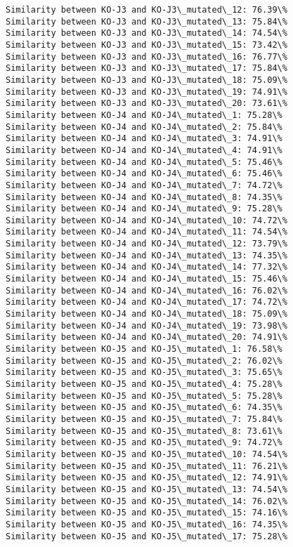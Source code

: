 \documentclass[11pt]{article}
\begin{document}
\begin{Verbatim}[commandchars=\\\{\}]
Similarity between KO-J3 and KO-J3\_mutated\_12: 76.39\%
Similarity between KO-J3 and KO-J3\_mutated\_13: 75.84\%
Similarity between KO-J3 and KO-J3\_mutated\_14: 74.54\%
Similarity between KO-J3 and KO-J3\_mutated\_15: 73.42\%
Similarity between KO-J3 and KO-J3\_mutated\_16: 76.77\%
Similarity between KO-J3 and KO-J3\_mutated\_17: 75.84\%
Similarity between KO-J3 and KO-J3\_mutated\_18: 75.09\%
Similarity between KO-J3 and KO-J3\_mutated\_19: 74.91\%
Similarity between KO-J3 and KO-J3\_mutated\_20: 73.61\%
Similarity between KO-J4 and KO-J4\_mutated\_1: 75.28\%
Similarity between KO-J4 and KO-J4\_mutated\_2: 75.84\%
Similarity between KO-J4 and KO-J4\_mutated\_3: 74.91\%
Similarity between KO-J4 and KO-J4\_mutated\_4: 74.91\%
Similarity between KO-J4 and KO-J4\_mutated\_5: 75.46\%
Similarity between KO-J4 and KO-J4\_mutated\_6: 75.46\%
Similarity between KO-J4 and KO-J4\_mutated\_7: 74.72\%
Similarity between KO-J4 and KO-J4\_mutated\_8: 74.35\%
Similarity between KO-J4 and KO-J4\_mutated\_9: 75.28\%
Similarity between KO-J4 and KO-J4\_mutated\_10: 74.72\%
Similarity between KO-J4 and KO-J4\_mutated\_11: 74.54\%
Similarity between KO-J4 and KO-J4\_mutated\_12: 73.79\%
Similarity between KO-J4 and KO-J4\_mutated\_13: 74.35\%
Similarity between KO-J4 and KO-J4\_mutated\_14: 77.32\%
Similarity between KO-J4 and KO-J4\_mutated\_15: 75.46\%
Similarity between KO-J4 and KO-J4\_mutated\_16: 76.02\%
Similarity between KO-J4 and KO-J4\_mutated\_17: 74.72\%
Similarity between KO-J4 and KO-J4\_mutated\_18: 75.09\%
Similarity between KO-J4 and KO-J4\_mutated\_19: 73.98\%
Similarity between KO-J4 and KO-J4\_mutated\_20: 74.91\%
Similarity between KO-J5 and KO-J5\_mutated\_1: 76.58\%
Similarity between KO-J5 and KO-J5\_mutated\_2: 76.02\%
Similarity between KO-J5 and KO-J5\_mutated\_3: 75.65\%
Similarity between KO-J5 and KO-J5\_mutated\_4: 75.28\%
Similarity between KO-J5 and KO-J5\_mutated\_5: 75.28\%
Similarity between KO-J5 and KO-J5\_mutated\_6: 74.35\%
Similarity between KO-J5 and KO-J5\_mutated\_7: 75.84\%
Similarity between KO-J5 and KO-J5\_mutated\_8: 73.61\%
Similarity between KO-J5 and KO-J5\_mutated\_9: 74.72\%
Similarity between KO-J5 and KO-J5\_mutated\_10: 74.54\%
Similarity between KO-J5 and KO-J5\_mutated\_11: 76.21\%
Similarity between KO-J5 and KO-J5\_mutated\_12: 74.91\%
Similarity between KO-J5 and KO-J5\_mutated\_13: 74.54\%
Similarity between KO-J5 and KO-J5\_mutated\_14: 76.02\%
Similarity between KO-J5 and KO-J5\_mutated\_15: 74.16\%
Similarity between KO-J5 and KO-J5\_mutated\_16: 74.35\%
Similarity between KO-J5 and KO-J5\_mutated\_17: 75.28\%

\end{Verbatim}
\end{document}
